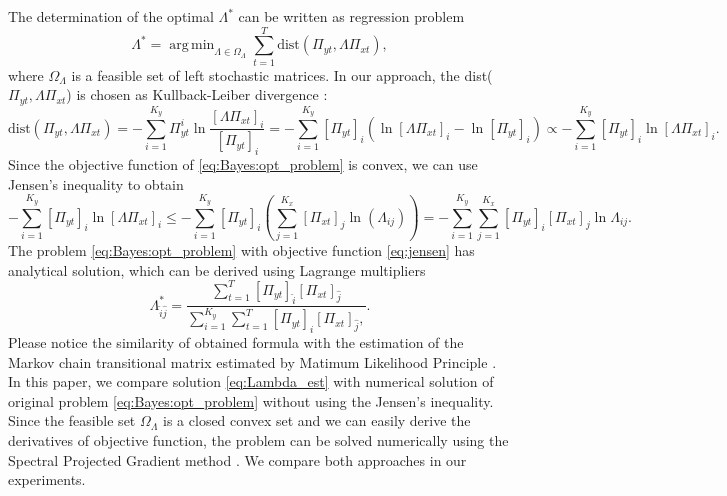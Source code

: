 \documentclass{aip-cp}
\DeclareMathOperator*{\argmin}{arg\,min}
\begin{document}
The determination of the optimal $\Lambda^{*}$ can be written as regression problem
\begin{equation}
    \Lambda^* = \argmin_{\Lambda \in \Omega_{\Lambda}} \sum_{t=1}^{T} \text{dist}(\Pi_{yt}, \Lambda\Pi_{xt}),
    \label{eq:Bayes:opt_problem}
\end{equation}
where $\Omega_{\Lambda}$ is a feasible set of left stochastic matrices. In our approach, the dist($\Pi_{yt}, \Lambda\Pi_{xt}$) is chosen as Kullback-Leiber divergence \cite{Kullback1951}:
\begin{equation}
    \text{dist}(\Pi_{yt}, \Lambda\Pi_{xt}) = - \sum_{i=1}^{K_y} \Pi_{yt}^i \ln\frac{[\Lambda\Pi_{xt}]_i}{[\Pi_{yt}]_i} = - \sum_{i=1}^{K_y} [\Pi_{yt}]_i (\ln [\Lambda\Pi_{xt}]_i - \ln [\Pi_{yt}]_i)
    \propto - \sum_{i=1}^{K_y} [\Pi_{yt}]_i \ln [\Lambda\Pi_{xt}]_i.
\end{equation}
Since the objective function of \eqref{eq:Bayes:opt_problem} is convex, we can use Jensen's inequality to obtain
\begin{equation}
\label{eq:jensen}
    - \sum_{i=1}^{K_y} [\Pi_{yt}]_i \ln [\Lambda\Pi_{xt}]_i \leq - \sum_{i=1}^{K_y} [\Pi_{yt}]_i ( \sum_{j=1}^{K_x} [\Pi_{xt}]_j \ln (\Lambda_{ij}) ) = - \sum_{i=1}^{K_y} \sum_{j=1}^{K_x} [\Pi_{yt}]_i [\Pi_{xt}]_j \ln \Lambda_{ij}.
\end{equation}
The problem \eqref{eq:Bayes:opt_problem} with objective function \eqref{eq:jensen} has analytical solution, which can be derived using Lagrange multipliers
\begin{equation}
\label{eq:Lambda_est}
    \Lambda_{\hat{i}\hat{j}}^{*} = \frac{\sum_{t=1}^{T} [\Pi_{yt}]_{\hat{i}} [\Pi_{xt}]_{\hat{j}}}{\sum_{i=1}^{K_y} \sum_{t=1}^{T} [\Pi_{yt}]_{i} [\Pi_{xt}]_{\hat{j}},}.
\end{equation}
Please notice the similarity of obtained formula with the estimation of the Markov chain transitional matrix estimated by Matimum Likelihood Principle \cite{NorBOOK-1998}.
In this paper, we compare solution \eqref{eq:Lambda_est} with numerical solution of original problem \eqref{eq:Bayes:opt_problem} without using the Jensen's inequality. Since the feasible set $\Omega_{\Lambda}$ is a closed convex set and we can easily derive the derivatives of objective function, the problem can be solved numerically using the Spectral Projected Gradient method \cite{birgin2000}. We compare both approaches in our experiments.
\end{document}
